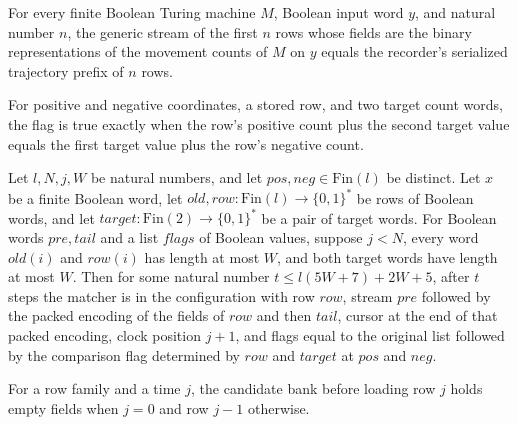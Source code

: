 \begin{lemma}
\label{Complexity.clRows_records}
\leanok
{}
For every finite Boolean Turing machine $M$, Boolean input word $y$, and natural number
$n$, the generic stream of the first $n$ rows whose fields are the binary
representations of the movement counts of $M$ on $y$ equals the recorder's serialized
trajectory prefix of $n$ rows.
\end{lemma}

\begin{definition}
\label{Complexity.clMatchFlag}
\leanok
{}
For positive and negative coordinates, a stored row, and two target count words, the flag is true exactly when the row's positive count plus the second target value equals the first target value plus the row's negative count.
\end{definition}

\begin{lemma}
\label{Complexity.clMatch_round}
\leanok
{}
Let $l,N,j,W$ be natural numbers, and let $pos,neg\in\mathrm{Fin}(l)$ be distinct. Let
$x$ be a finite Boolean word, let $old,row:\mathrm{Fin}(l)\to\{0,1\}^*$ be rows of
Boolean words, and let $target:\mathrm{Fin}(2)\to\{0,1\}^*$ be a pair of target words.
For Boolean words $pre,tail$ and a list $flags$ of Boolean values, suppose $j<N$, every
word $old(i)$ and $row(i)$ has length at most $W$, and both target words have length at
most $W$. Then for some natural number $t\le l(5W+7)+2W+5$, after $t$ steps the matcher
is in the configuration with row $row$, stream $pre$ followed by the packed encoding of
the fields of $row$ and then $tail$, cursor at the end of that packed encoding, clock
position $j+1$, and flags equal to the original list followed by the comparison flag
determined by $row$ and $target$ at $pos$ and $neg$.
\end{lemma}

\begin{definition}
\label{Complexity.clPriorRow}
\leanok
For a row family and a time $j$, the candidate bank before loading row $j$ holds empty fields when $j = 0$ and row $j - 1$ otherwise.
\end{definition}

